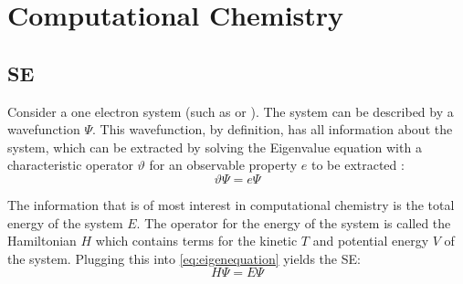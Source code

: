 \documentclass[../master_thesis.tex]{subfiles}
\begin{document}
\chapter{Computational Chemistry}
\section{\ac{SE}}

Consider a one electron system (such as  or ). The system can be
described by a wavefunction $\Psi$. This wavefunction, by definition, has all
information about the system, which can be extracted by solving the Eigenvalue
equation with a characteristic operator $\vartheta$ for an observable property
$ e $ to be extracted \cite{Cramer:2004}:
\begin{equation}
  \vartheta\Psi = e\Psi\label{eq:eigenequation}
\end{equation}

The information that is of most interest in computational chemistry is the total
energy of the system $ E $. The operator for the energy of the system is called
the Hamiltonian $H$ which contains terms for the kinetic $T$ and potential
energy $V$ of the system. Plugging this into \ref{eq:eigenequation} yields the
\ac{SE}:
\begin{equation}
  H\Psi = E\Psi\label{eq:SE}
\end{equation}




\biblio
\end{document}
